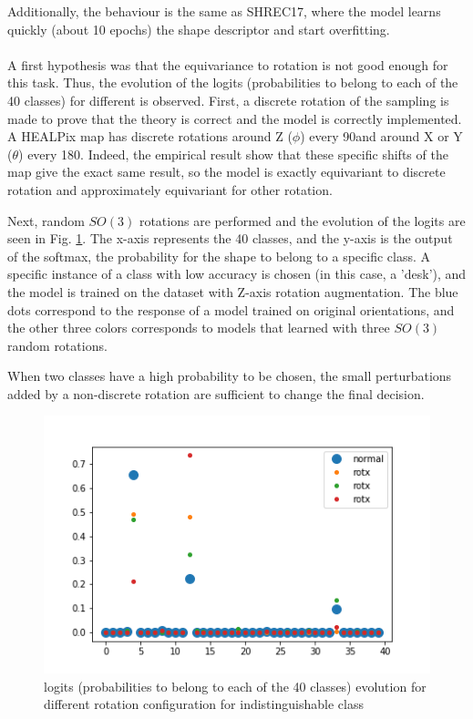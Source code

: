 \documentclass[11pt]{report}
\begin{document}
Additionally, the behaviour is the same as SHREC17, where the model learns quickly (about 10 epochs) the shape descriptor and start overfitting.

\paragraph*{}
A first hypothesis was that the equivariance to rotation is not good enough for this task. Thus, the evolution of the logits (probabilities to belong to each of the 40 classes) for different is observed. First, a discrete rotation of the sampling is made to prove that the theory is correct and the model is correctly implemented. A HEALPix map has discrete rotations around Z ($\phi$) every 90\degree and around X or Y ($\theta$) every 180\degree. Indeed, the empirical result show that these specific shifts of the map give the exact same result, so the model is exactly equivariant to discrete rotation and approximately equivariant for other rotation.

Next, random $SO(3)$ rotations are performed and the evolution of the logits are seen in Fig. \ref{fig:mn40_logits}. The x-axis represents the 40 classes, and the y-axis is the output of the softmax, the probability for the shape to belong to a specific class. A specific instance of a class with low accuracy is chosen (in this case, a 'desk'), and the model is trained on the dataset with Z-axis rotation augmentation.
The blue dots correspond to the response of a model trained on original orientations, and the other three colors corresponds to models that learned with three $SO(3)$ random rotations.

When two classes have a high probability to be chosen, the small perturbations added by a non-discrete rotation are sufficient to change the final decision.
\begin{figure}[!ht]
    \centering
    \includegraphics[width=0.7\linewidth]{figures/logits_change.png}
    \caption{logits (probabilities to belong to each of the 40 classes) evolution for different rotation configuration for indistinguishable class}
    \label{fig:mn40_logits}
\end{figure}
\end{document}
